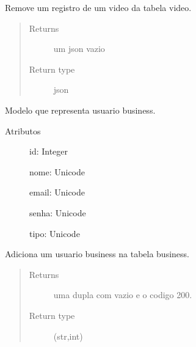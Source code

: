 \documentclass[letterpaper,10pt,english]{sphinxmanual}
\begin{document}

\begin{fulllineitems}
\label{\detokenize{index:video.rm_video}}
Remove um registro de um video da tabela
video.
\begin{quote}\begin{description}
\item[{Returns}] \leavevmode
um json vazio

\item[{Return type}] \leavevmode
json

\end{description}\end{quote}

\end{fulllineitems}


\begin{fulllineitems}
\label{\detokenize{index:business.Business}}
Modelo que representa usuario business.
\begin{description}
\item[{Atributos}] \leavevmode
id: Integer

nome: Unicode

email: Unicode

senha: Unicode

tipo: Unicode

\end{description}

\end{fulllineitems}


\begin{fulllineitems}
\label{\detokenize{index:business.add_Business}}
Adiciona um usuario business na tabela
business.
\begin{quote}\begin{description}
\item[{Returns}] \leavevmode
uma dupla com vazio e o codigo 200.

\item[{Return type}] \leavevmode
(str,int)

\end{description}\end{quote}

\end{fulllineitems}
\end{document}
